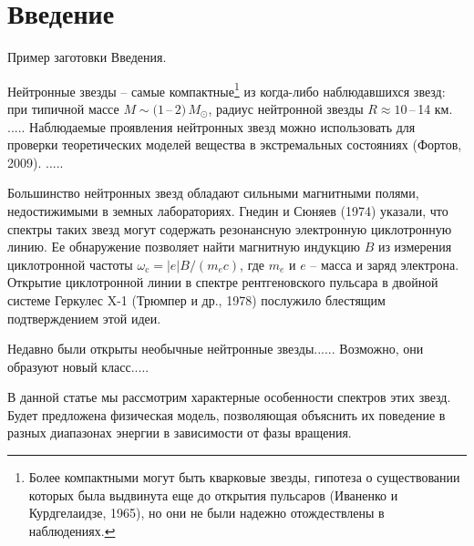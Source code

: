 \documentclass{pazh2col-win}
\begin{document}


\section{Введение}
\label{introduction}

Пример заготовки Введения.
                           
Нейтронные звезды -- самые компактные\footnote{%
Более компактными могут
быть кварковые звезды, гипотеза  о существовании которых
была выдвинута еще до открытия пульсаров (Иваненко и Курдгелаидзе,
1965), но они не были надежно отождествлены в наблюдениях.}
 из когда-либо
наблюдавшихся звезд: при типичной массе $M\sim
(1$\,--\,$2)\, M_\odot$, радиус нейтронной звезды $R\approx10$\,--\,14
км. ..... Наблюдаемые проявления
нейтронных звезд можно использовать для проверки
теоретических моделей вещества в экстремальных состояниях
(Фортов, 2009). .....

Большинство нейтронных звезд обладают сильными
магнитными полями, недостижимыми в земных лабораториях. 
Гнедин и Сюняев (1974) указали, что спектры
таких звезд могут содержать резонансную электронную
циклотронную линию. Ее обнаружение позволяет 
найти магнитную индукцию $B$ из измерения
циклотронной частоты $\omega_\mathrm{c}=|e|B/(m_e c)$, где $m_e$ и $e$
-- масса и заряд электрона. Открытие  циклотронной линии в спектре
рентгеновского пульсара в двойной системе Геркулес X-1
(Трюмпер и др., 1978) послужило блестящим подтверждением этой
идеи.

Недавно были открыты необычные нейтронные звезды...... 
Возможно, они образуют новый класс.....

В данной статье мы рассмотрим 
характерные особенности спектров этих звезд. Будет предложена физическая модель, позволяющая объяснить
их поведение в разных диапазонах энергии в зависимости от фазы вращения.
\end{document}
